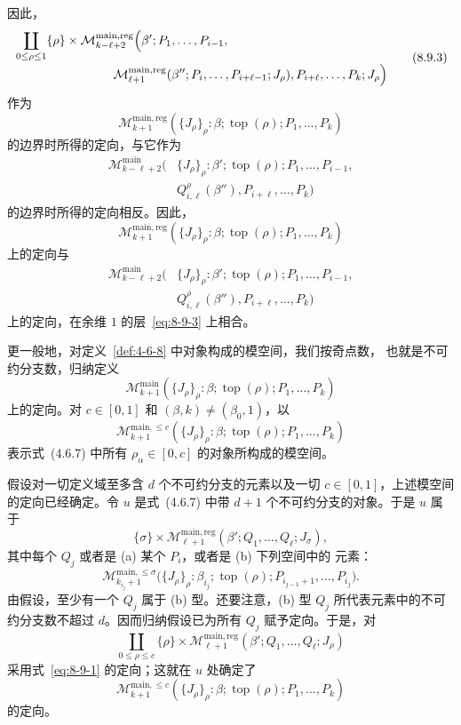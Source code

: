 因此，
\begin{equation}
\begin{aligned}
 &\coprod_{0\leq\rho\leq1}\{\rho\}\times
 \mathcal M_{k-\ell+2}^{\mathrm{main},\mathrm{reg}}
 \Bigl(\beta';P_1,\ldots,P_{i-1},\\[-2pt]
 &\hspace{8em}
 \mathcal M_{\ell+1}^{\mathrm{main},\mathrm{reg}}
 (\beta'';P_i,\ldots,P_{i+\ell-1};J_\rho),
 P_{i+\ell},\ldots,P_k;J_\rho\Bigr)
\end{aligned}
\tag{8.9.3}\label{eq:8-9-3}
\end{equation}
作为
\[
 \mathcal M_{k+1}^{\mathrm{main},\mathrm{reg}}
 (\{J_\rho\}_\rho:\beta;\operatorname{top}(\rho);
 P_1,\ldots,P_k)
\]
的边界时所得的定向，与它作为
\[
\begin{aligned}
 \mathcal M_{k-\ell+2}^{\mathrm{main}}
 \bigl(&\{J_\rho\}_\rho:\beta';\operatorname{top}(\rho);
 P_1,\ldots,P_{i-1},\\[-2pt]
 &Q_{i,\ell}^{\rho}(\beta''),
 P_{i+\ell},\ldots,P_k\bigr)
\end{aligned}
\]
的边界时所得的定向相反。因此，
\[
 \mathcal M_{k+1}^{\mathrm{main},\mathrm{reg}}
 (\{J_\rho\}_\rho:\beta;\operatorname{top}(\rho);
 P_1,\ldots,P_k)
\]
上的定向与
\[
\begin{aligned}
 \mathcal M_{k-\ell+2}^{\mathrm{main}}
 \bigl(&\{J_\rho\}_\rho:\beta';\operatorname{top}(\rho);
 P_1,\ldots,P_{i-1},\\[-2pt]
 &Q_{i,\ell}^{\rho}(\beta''),
 P_{i+\ell},\ldots,P_k\bigr)
\end{aligned}
\]
上的定向，在余维 $1$ 的层~\eqref{eq:8-9-3} 上相合。

更一般地，对定义~\ref{def:4-6-8} 中对象构成的模空间，我们按奇点数，
也就是不可约分支数，归纳定义
\[
 \mathcal M_{k+1}^{\mathrm{main}}
 (\{J_\rho\}_\rho:\beta;\operatorname{top}(\rho);
 P_1,\ldots,P_k)
\]
上的定向。对 $c\in[0,1]$ 和 $(\beta,k)\ne(\beta_0,1)$，以
\[
 \mathcal M_{k+1}^{\mathrm{main},\leq c}
 (\{J_\rho\}_\rho:\beta;\operatorname{top}(\rho);
 P_1,\ldots,P_k)
\]
表示式~(4.6.7) 中所有 $\rho_\alpha\in[0,c]$ 的对象所构成的模空间。

假设对一切定义域至多含 $d$ 个不可约分支的元素以及一切
$c\in[0,1]$，上述模空间的定向已经确定。令 $u$ 是式~(4.6.7)
中带 $d+1$ 个不可约分支的对象。于是 $u$ 属于
\[
 \{\sigma\}\times
 \mathcal M_{\ell+1}^{\mathrm{main},\mathrm{reg}}
 (\beta';Q_1,\ldots,Q_\ell;J_\sigma),
\]
其中每个 $Q_j$ 或者是 (a) 某个 $P_i$，或者是 (b) 下列空间中的
元素：
\[
 \mathcal M_{k_{i_j}+1}^{\mathrm{main},\leq\sigma}
 \bigl(\{J_\rho\}_\rho:\beta_{i_j};\operatorname{top}(\rho);
 P_{i_{j-1}+1},\ldots,P_{i_j}\bigr).
\]
由假设，至少有一个 $Q_j$ 属于 (b) 型。还要注意，(b) 型 $Q_j$
所代表元素中的不可约分支数不超过 $d$。因而归纳假设已为所有 $Q_j$
赋予定向。于是，对
\[
 \coprod_{0\leq\rho\leq c}\{\rho\}\times
 \mathcal M_{\ell+1}^{\mathrm{main},\mathrm{reg}}
 (\beta';Q_1,\ldots,Q_\ell;J_\rho)
\]
采用式~\eqref{eq:8-9-1} 的定向；这就在 $u$ 处确定了
\[
 \mathcal M_{k+1}^{\mathrm{main},\leq c}
 (\{J_\rho\}_\rho:\beta;\operatorname{top}(\rho);
 P_1,\ldots,P_k)
\]
的定向。

